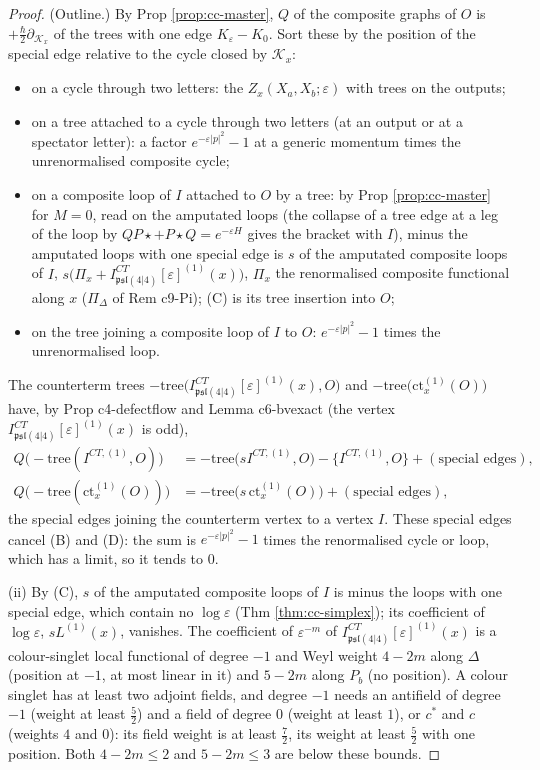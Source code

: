 \documentclass[11pt]{article}
\numberwithin{equation}{section}
\theoremstyle{plain}
\theoremstyle{definition}
\begin{document}
\begin{proof}
(Outline.) By Prop \ref{prop:cc-master}, $Q$ of the composite graphs of $O$ is $+\tfrac\hbar2\partial_{\mathcal K_x}$ of the trees with one edge $K_\varepsilon-K_0$. Sort these by the position of the special edge relative to the cycle closed by $\mathcal K_x$:
\begin{itemize}
\item[(A)] on a cycle through two letters: the $Z_x(X_a,X_b;\varepsilon)$ with trees on the outputs;
\item[(B)] on a tree attached to a cycle through two letters (at an output or at a spectator letter): a factor $e^{-\varepsilon|p|^2}-1$ at a generic momentum times the unrenormalised composite cycle;
\item[(C)] on a composite loop of $I$ attached to $O$ by a tree: by Prop \ref{prop:cc-master} for $M=0$, read on the amputated loops (the collapse of a tree edge at a leg of the loop by $QP\star+P\star Q=e^{-\varepsilon H}$ gives the bracket with $I$), minus the amputated loops with one special edge is $s$ of the amputated composite loops of $I$, $s\big(\Pi_x+I^{CT}_{\mathfrak{psl}(4|4)}[\varepsilon]^{(1)}(x)\big)$, $\Pi_x$ the renormalised composite functional along $x$ ($\Pi_\Delta$ of Rem c9-Pi); (C) is its tree insertion into $O$;
\item[(D)] on the tree joining a composite loop of $I$ to $O$: $e^{-\varepsilon|p|^2}-1$ times the unrenormalised loop.
\end{itemize}
The counterterm trees $-\mathrm{tree}\big(I^{CT}_{\mathfrak{psl}(4|4)}[\varepsilon]^{(1)}(x),O\big)$ and $-\mathrm{tree}\big(\mathrm{ct}^{(1)}_x(O)\big)$ have, by Prop c4-defectflow and Lemma c6-bvexact (the vertex $I^{CT}_{\mathfrak{psl}(4|4)}[\varepsilon]^{(1)}(x)$ is odd),
\[
\begin{aligned}
Q\big(-\mathrm{tree}(I^{CT,(1)},O)\big)&=-\mathrm{tree}\big(sI^{CT,(1)},O\big)-\{I^{CT,(1)},O\}+(\text{special edges}),\\
Q\big(-\mathrm{tree}(\mathrm{ct}^{(1)}_x(O))\big)&=-\mathrm{tree}\big(s\,\mathrm{ct}^{(1)}_x(O)\big)+(\text{special edges}),
\end{aligned}
\]
the special edges joining the counterterm vertex to a vertex $I$. These special edges cancel (B) and (D): the sum is $e^{-\varepsilon|p|^2}-1$ times the renormalised cycle or loop, which has a limit, so it tends to $0$.

(ii) By (C), $s$ of the amputated composite loops of $I$ is minus the loops with one special edge, which contain no $\log\varepsilon$ (Thm \ref{thm:cc-simplex}); its coefficient of $\log\varepsilon$, $sL^{(1)}(x)$, vanishes. The coefficient of $\varepsilon^{-m}$ of $I^{CT}_{\mathfrak{psl}(4|4)}[\varepsilon]^{(1)}(x)$ is a colour-singlet local functional of degree $-1$ and Weyl weight $4-2m$ along $\Delta$ (position at $-1$, at most linear in it) and $5-2m$ along $P_b$ (no position). A colour singlet has at least two adjoint fields, and degree $-1$ needs an antifield of degree $-1$ (weight at least $\tfrac52$) and a field of degree $0$ (weight at least $1$), or $c^*$ and $c$ (weights $4$ and $0$): its field weight is at least $\tfrac72$, its weight at least $\tfrac52$ with one position. Both $4-2m\le2$ and $5-2m\le3$ are below these bounds.


\end{proof}
\end{document}
